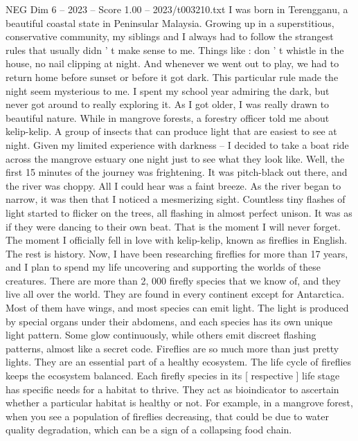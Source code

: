 \begin{textsample}{NEG Dim 6 – 2023 – Score 1.00 – 2023/t003210.txt}  \label{ex:f6_neg_009}
I was born in Terengganu, a beautiful coastal state in Peninsular Malaysia.
Growing up in a superstitious, conservative community, my siblings and I always had to follow the strangest rules that usually didn ' t make sense to me.
Things like : don ' t whistle in the house, no nail clipping at night.
And whenever we went out to play, we had to return home before sunset or before it got dark.
This particular rule made the night seem mysterious to me.
I spent my school year admiring the dark, but never got around to really exploring it.
As I got older, I was really drawn to beautiful nature.
While in mangrove forests, a forestry officer told me about kelip-kelip.
A group of insects that can produce light that are easiest to see at night.
Given my limited experience with darkness -- I decided to take a boat ride across the mangrove estuary one night just to see what they look like.
Well, the first 15 minutes of the journey was frightening.
It was pitch-black out there, and the river was choppy.
All I could hear was a faint breeze.
As the river began to narrow, it was then that I noticed a mesmerizing sight.
Countless tiny flashes of light started to flicker on the trees, all flashing in almost perfect unison.
It was as if they were dancing to their own beat.
That is the moment I will never forget.
The moment I officially fell in love with kelip-kelip, known as fireflies in English.
The rest is history.
Now, I have been researching fireflies for more than 17 years, and I plan to spend my life uncovering and supporting the worlds of these creatures.
There are more than 2, 000 firefly species that we know of, and they live all over the world.
They are found in every continent except for Antarctica.
Most of them have wings, and most species can emit light.
The light is produced by special organs under their abdomens, and each species has its own unique light pattern.
Some glow continuously, while others emit discreet flashing patterns, almost like a secret code.
Fireflies are so much more than just pretty lights.
They are an essential part of a healthy ecosystem.
The life cycle of fireflies keeps the ecosystem balanced.
Each firefly species in its [ respective ] life stage has specific needs for a habitat to thrive.
They act as bioindicator to ascertain whether a particular habitat is healthy or not.
For example, in a mangrove forest, when you see a population of fireflies decreasing, that could be due to water quality degradation, which can be a sign of a collapsing food chain.

\end{textsample}
